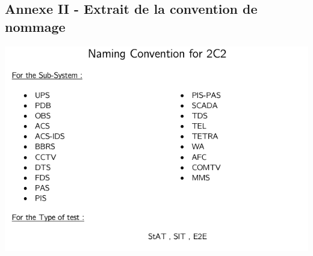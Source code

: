 \subsection*{Annexe II - Extrait de la convention de nommage }

\begin{center}
\includegraphics[scale=0.75]{ressources/images/annexes/convention.png}
\end{center}
